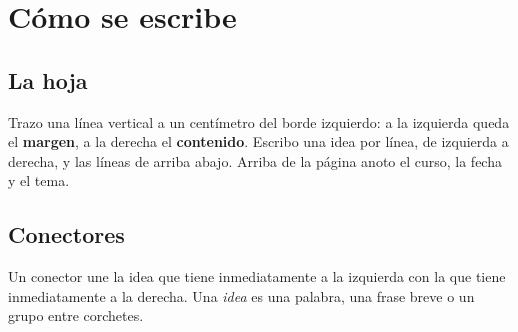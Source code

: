 \section{Cómo se escribe}\label{sec:reglas}

\subsection{La hoja}
Trazo una línea vertical a un centímetro del borde izquierdo: a la izquierda
queda el \textbf{margen}, a la derecha el \textbf{contenido}. Escribo una idea
por línea, de izquierda a derecha, y las líneas de arriba abajo. Arriba de la
página anoto el curso, la fecha y el tema.

\begin{apunte}
\end{apunte}

\subsection{Conectores}
Un conector une la idea que tiene inmediatamente a la izquierda con la que
tiene inmediatamente a la derecha. Una \emph{idea} es una palabra, una frase
breve o un grupo entre corchetes.

